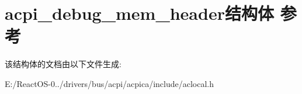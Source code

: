 \hypertarget{structacpi__debug__mem__header}{}\section{acpi\+\_\+debug\+\_\+mem\+\_\+header结构体 参考}
\label{structacpi__debug__mem__header}


该结构体的文档由以下文件生成\+:\begin{DoxyCompactItemize}
\item 
E\+:/\+React\+O\+S-\/0../drivers/bus/acpi/acpica/include/aclocal.\+h\end{DoxyCompactItemize}
